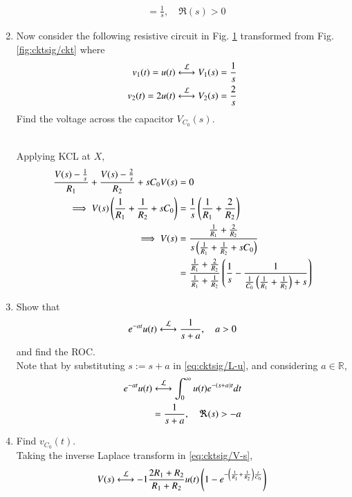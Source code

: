 \documentclass[journal,12pt,twocolumn]{IEEEtran}
\renewcommand\thesection{\arabic{section}}
\begin{document}
\begin{enumerate}[label=\arabic*.,ref=\thesection.\theenumi]
\begin{align}
         &= \frac{1}{s}, \quad \Re{(s)} > 0
         \label{eq:cktsig/L-u}
\end{align}
\item Now consider the following resistive circuit 
in Fig. 
\ref{fig:cktsig/sckt-q1-s}
	transformed from 
Fig. \ref{fig:cktsig/ckt}
		where 
		\begin{align}
			v_1(t) = u(t) \overset{\mathcal{L}}{\longleftrightarrow} V_1(s) = \frac{1}{s}
			\\
			v_2(t) = 2u(t) \overset{\mathcal{L}}{\longleftrightarrow} V_2(s) = \frac{2}{s}
		\end{align}
		Find the voltage across the capacitor $V_{C_0}(s)$.
\begin{figure}[!htb]
	\centering
	
\caption{}
\label{fig:cktsig/sckt-q1-s}
\end{figure}
\\
\solution Applying KCL at $X$,
\begin{align}
	\frac{V(s) - \frac{1}{s}}{R_1} + \frac{V(s) - \frac{2}{s}}{R_2} + sC_0V(s) &= 0 \\
	\implies	V(s)\brak{\frac{1}{R_1} + \frac{1}{R_2} + sC_0} &= \frac{1}{s}\brak{\frac{1}{R_1} + \frac{2}{R_2}} \\
\implies	V(s) &= \frac{\frac{1}{R_1} + \frac{2}{R_2}}{s\brak{\frac{1}{R_1} + \frac{1}{R_2} + sC_0}} \\
    &= \frac{\frac{1}{R_1} + \frac{2}{R_2}}{\frac{1}{R_1} + \frac{1}{R_2}}\brak{\frac{1}{s} - \frac{1}{\frac{1}{C_0}\brak{\frac{1}{R_1} + \frac{1}{R_2}} + s}} 
    \label{eq:cktsig/V-s}
\end{align}
\item Show that 
		\begin{align}
			e^{-at}u(t) \system{L} \frac{1}{s+a}, \quad a > 0
			\label{eq:cktsig-exp}
		\end{align}
		and find the ROC.
		\\
\solution Note that by substituting $s := s + a$ in \eqref{eq:cktsig/L-u}, and considering
$a \in \mathbb{R}$,
\begin{align}
	e^{-at}u(t) &\system{L} \int_{0}^{\infty}u(t)e^{-(s + a)t}dt \\
                &= \frac{1}{s + a}, \quad \Re{(s)} > -a
                \label{eq:cktsig/L-u-shift}
\end{align}
\item Find $v_{C_0}(t)$.  
	\\
\solution Taking the inverse Laplace transform in \eqref{eq:cktsig/V-s},
\begin{align}
	V(s) \system{L}{-1} \frac{2R_1 + R_2}{R_1 + R_2}u(t)\brak{1 - e^{-\brak{\frac{1}{R_1} + \frac{1}{R_2}}\frac{t}{C_0}}} 

\end{align}
\end{enumerate}
\end{document}
